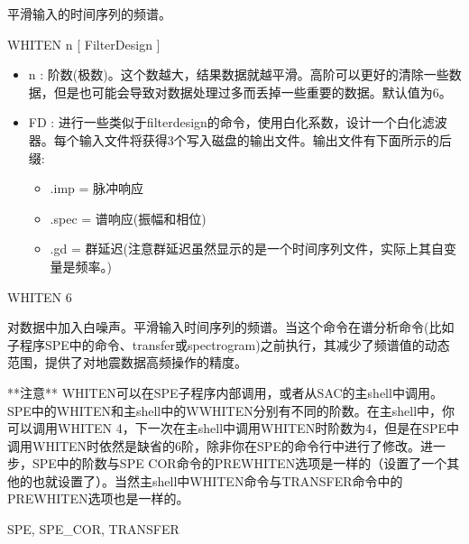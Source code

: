 \label{cmd:whiten}

平滑输入的时间序列的频谱。

WHITEN n [ FilterDesign ]

\begin{itemize}
\item n :  阶数(极数)。这个数越大，结果数据就越平滑。高阶可以更好的清除一些数据，但是也可能会导致对数据处理过多而丢掉一些重要的数据。默认值为6。 
\item FD : 进行一些类似于filterdesign的命令，使用白化系数，设计一个白化滤波器。每个输入文件将获得3个写入磁盘的输出文件。输出文件有下面所示的后缀:  
	\begin{itemize}
	\item .imp = 脉冲响应
	\item .spec = 谱响应(振幅和相位)
	\item .gd = 群延迟(注意群延迟虽然显示的是一个时间序列文件，实际上其自变量是频率。)
	\end{itemize}
\end{itemize}

WHITEN 6

对数据中加入白噪声。平滑输入时间序列的频谱。当这个命令在谱分析命令(比如子程序SPE中的命令、transfer或spectrogram)之前执行，其减少了频谱值的动态范围，提供了对地震数据高频操作的精度。

**注意**  WHITEN可以在SPE子程序内部调用，或者从SAC的主shell中调用。SPE中的WHITEN和主shell中的WWHITEN分别有不同的阶数。在主shell中，你可以调用WHITEN 4，下一次在主shell中调用WHITEN时阶数为4，但是在SPE中调用WHITEN时依然是缺省的6阶，除非你在SPE的命令行中进行了修改。进一步，SPE中的阶数与SPE COR命令的PREWHITEN选项是一样的（设置了一个其他的也就设置了）。当然主shell中WHITEN命令与TRANSFER命令中的PREWHITEN选项也是一样的。

SPE, SPE\_COR, TRANSFER

